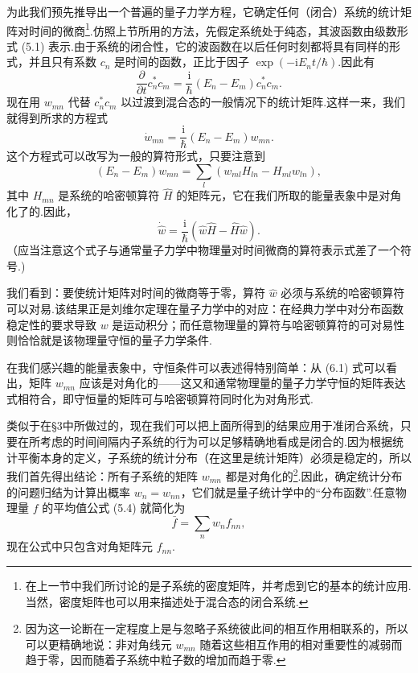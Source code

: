 为此我们预先推导出一个普遍的量子力学方程，它确定任何（闭合）系统的统计矩阵对时间的微商\footnote{在上一节中我们所讨论的是子系统的密度矩阵，并考虑到它的基本的统计应用.当然，密度矩阵也可以用来描述处于混合态的闭合系统.}.仿照上节所用的方法，先假定系统处于纯态，其波函数由级数形式 (5.1) 表示.由于系统的闭合性，它的波函数在以后任何时刻都将具有同样的形式，并且只有系数 $c_n$ 是时间的函数，正比于因子 $\exp(-\mathrm{i}E_nt/\hbar)$.因此有
\begin{equation*}
  \frac{\partial}{\partial t}c_n^{*}c_m
  =\frac{\mathrm{i}}{\hbar}(E_n-E_m)c_n^{*}c_m.
\end{equation*}
现在用 $w_{mn}$ 代替 $c_n^{*}c_m$ 以过渡到混合态的一般情况下的统计矩阵.这样一来，我们就得到所求的方程式
\begin{equation}
  \dot{w}_{mn}=\frac{\mathrm{i}}{\hbar}(E_n-E_m)w_{mn}.
\end{equation}
这个方程式可以改写为一般的算符形式，只要注意到
\begin{equation*}
  (E_n-E_m)w_{mn}
  =\sum_l\left(w_{ml}H_{ln}-H_{ml}w_{ln}\right),
\end{equation*}
其中 $H_{mn}$ 是系统的哈密顿算符 $\hat{H}$ 的矩阵元，它在我们所取的能量表象中是对角化了的.因此，
\begin{equation}
  \dot{\hat{w}}=\frac{\mathrm{i}}{\hbar}
  \left(\hat{w}\hat{H}-\hat{H}\hat{w}\right).
\end{equation}
（应当注意这个式子与通常量子力学中物理量对时间微商的算符表示式差了一个符号.)

我们看到：要使统计矩阵对时间的微商等于零，算符 $\hat{w}$ 必须与系统的哈密顿算符可以对易.该结果正是刘维尔定理在量子力学中的对应：在经典力学中对分布函数稳定性的要求导致 $w$ 是运动积分；而任意物理量的算符与哈密顿算符的可对易性则恰恰就是该物理量守恒的量子力学条件.

在我们感兴趣的能量表象中，守恒条件可以表述得特别简单：从 (6.1) 式可以看出，矩阵 $w_{mn}$ 应该是对角化的——这又和通常物理量的量子力学守恒的矩阵表达式相符合，即守恒量的矩阵可与哈密顿算符同时化为对角形式.

类似于在§3中所做过的，现在我们可以把上面所得到的结果应用于准闭合系统，只要在所考虑的时间间隔内子系统的行为可以足够精确地看成是闭合的.因为根据统计平衡本身的定义，子系统的统计分布（在这里是统计矩阵）必须是稳定的，所以我们首先得出结论：所有子系统的矩阵 $w_{mn}$ 都是对角化的\footnote{因为这一论断在一定程度上是与忽略子系统彼此间的相互作用相联系的，所以可以更精确地说：非对角线元 $w_{mn}$ 随着这些相互作用的相对重要性的减弱而趋于零，因而随着子系统中粒子数的增加而趋于零.}.因此，确定统计分布的问题归结为计算出概率 $w_n=w_{nn}$，它们就是量子统计学中的“分布函数”.任意物理量 $f$ 的平均值公式 (5.4) 就简化为
\begin{equation}
  \bar{f}=\sum_n w_n f_{nn},
\end{equation}
现在公式中只包含对角矩阵元 $f_{nn}$.

